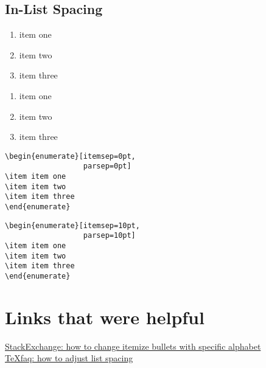 \documentclass[12pt, letterpaper]{article}
\begin{document}
\subsection{In-List Spacing}
\begin{multicols}{2}
\begin{enumerate}[itemsep=0pt, parsep=0pt]
	\item item one
	\item item two
	\item item three
\end{enumerate} 
\columnbreak 
\begin{enumerate}[itemsep=10pt, parsep=10pt]
	\item item one
	\item item two
	\item item three
\end{enumerate} 
\end{multicols}
\begin{multicols}{2}
\begin{lstlisting}
\begin{enumerate}[itemsep=0pt,
                  parsep=0pt]
\item item one
\item item two
\item item three
\end{enumerate} 
\end{lstlisting}
	\columnbreak 
\begin{lstlisting}
\begin{enumerate}[itemsep=10pt, 
                  parsep=10pt]
\item item one
\item item two
\item item three
\end{enumerate} 
\end{lstlisting}
\end{multicols}


\section{Links that were helpful} 
\href{https://tex.stackexchange.com/questions/278877/how-to-change-itemize-bullets-with-specific-alphabet}{StackExchange: how to change itemize bullets with specific alphabet} \\
\href{https://texfaq.org/FAQ-complist}{TeXfaq: how to adjust list spacing}
\end{document}
